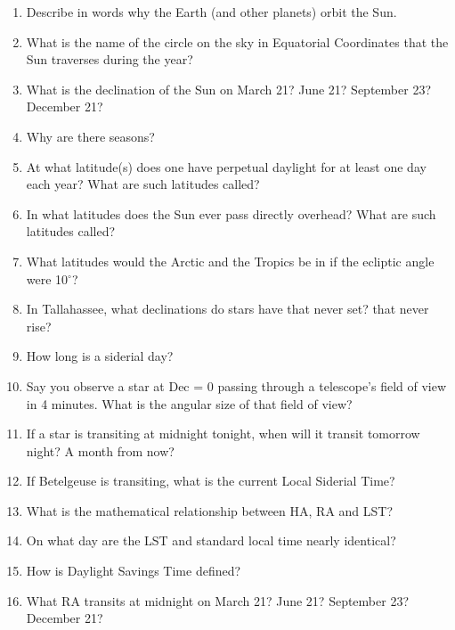 
\begin{enumerate}
\item Describe in words why the Earth (and other planets) orbit the
  Sun. 
\vspace{80pt}
\item  What is the name of the circle on the sky in Equatorial
  Coordinates that the Sun traverses during the year?
\vspace{80pt}
\item  What is the declination of the Sun on March 21? June 21?
  September 23? December 21?
\vspace{80pt}
\item Why are there seasons?
\vspace{80pt}
\item At what latitude(s) does one have perpetual daylight for at least
  one day each year? What are such latitudes called?
\vspace{80pt}
\item In what latitudes does the Sun ever pass directly overhead? What
  are such latitudes called?
\vspace{80pt}
\item What latitudes would the Arctic and the Tropics be in if the
  ecliptic angle were 10$^\circ$?
\vspace{80pt}
\item In Tallahassee, what declinations do stars have that never set?
  that never rise?
\vspace{80pt}
\item How long is a siderial day?
\vspace{80pt}
\item Say you observe a star at Dec = 0 passing through a telescope's
  field of view in 4 minutes. What is the angular size of that field
  of view?
\vspace{80pt}
\item If a star is transiting at midnight tonight, when will it
  transit tomorrow night? A month from now?
\vspace{80pt}
\item If Betelgeuse is transiting, what is the current Local Siderial
  Time?
\vspace{80pt}
\item What is the mathematical relationship between HA, RA and LST?
\vspace{80pt}
\item On what day are the LST and standard local time nearly
  identical?
\vspace{80pt}
\item How is Daylight Savings Time defined?
\vspace{80pt}
\item What RA transits at midnight on March 21? June 21? September 23?
  December 21?
\vspace{80pt}
\end{enumerate}
